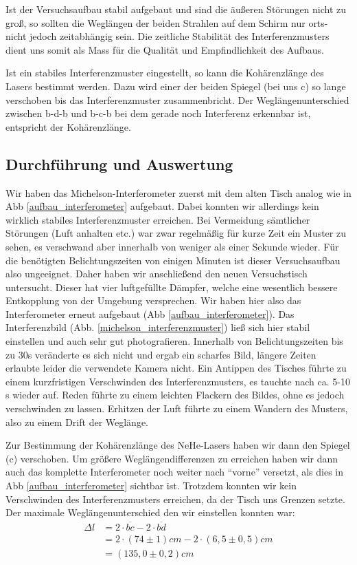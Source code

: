 Ist der Versuchsaufbau stabil aufgebaut und sind die äußeren Störungen nicht zu groß, so sollten die Weglängen der beiden Strahlen auf dem Schirm nur orts- nicht jedoch zeitabhängig sein. Die zeitliche Stabilität des Interferenzmusters dient uns somit als Mass für die Qualität und Empfindlichkeit des Aufbaus.

Ist ein stabiles Interferenzmuster eingestellt, so kann die Kohärenzlänge des Lasers bestimmt werden. Dazu wird einer der beiden Spiegel (bei uns c) so lange verschoben bis das Interferenzmuster zusammenbricht. Der Weglängenunterschied zwischen b-d-b und b-c-b bei dem gerade noch Interferenz erkennbar ist, entspricht der Kohärenzlänge.


\subsection{Durchführung und Auswertung}

Wir haben das Michelson-Interferometer zuerst mit dem alten Tisch analog wie in Abb \ref{aufbau_interferometer} aufgebaut. Dabei konnten wir allerdings kein wirklich stabiles Interferenzmuster erreichen. Bei Vermeidung sämtlicher Störungen (Luft anhalten etc.) war zwar regelmäßig für kurze Zeit ein Muster zu sehen, es verschwand aber innerhalb von weniger als einer Sekunde wieder. Für die benötigten Belichtungszeiten von einigen Minuten ist dieser Versuchsaufbau also ungeeignet.
Daher haben wir anschließend den neuen Versuchstisch untersucht. Dieser hat vier luftgefüllte Dämpfer, welche eine wesentlich bessere Entkopplung von der Umgebung versprechen. Wir haben hier also das Interferometer erneut aufgebaut (Abb \ref{aufbau_interferometer}). Das Interferenzbild (Abb. \ref{michelson_interferenzmuster}) ließ sich hier stabil einstellen und auch sehr gut photografieren. Innerhalb von Belichtungszeiten bis zu 30s veränderte es sich nicht und ergab ein scharfes Bild, längere Zeiten erlaubte leider die verwendete Kamera nicht. Ein Antippen des Tisches führte zu einem kurzfristigen Verschwinden des Interferenzmusters, es tauchte nach ca. 5-10 s wieder auf.  Reden führte zu einem leichten Flackern des Bildes, ohne es jedoch verschwinden zu lassen. Erhitzen der Luft führte zu einem Wandern des Musters, also zu einem Drift der Weglänge.

Zur Bestimmung der Kohärenzlänge des NeHe-Lasers haben wir dann den Spiegel (c) verschoben. Um größere Weglängendifferenzen zu erreichen haben wir dann auch das komplette Interferometer noch weiter nach "`vorne"' versetzt, als dies in Abb \ref{aufbau_interferometer} sichtbar ist. Trotzdem konnten wir kein Verschwinden des Interferenzmusters erreichen, da der Tisch uns Grenzen setzte. Der maximale Weglängenunterschied den wir einstellen konnten war:
\begin{align*}
 \Delta l & = 2 \cdot \overline{bc} - 2 \cdot \overline{bd} \\
          & = 2 \cdot (74 \pm 1) cm - 2 \cdot ( 6,5 \pm 0,5 ) cm \\
	  & = (135,0 \pm 0,2) cm
\end{align*}

